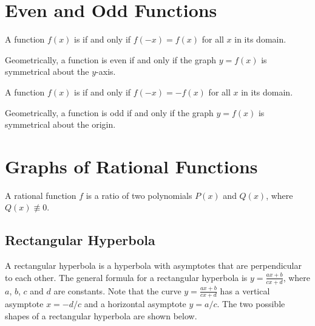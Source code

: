 \section{Even and Odd Functions}

\begin{definition}
    A function $f(x)$ is  if and only if $f(-x) = f(x)$ for all $x$ in its domain.
\end{definition}

Geometrically, a function is even if and only if the graph $y = f(x)$ is symmetrical about the $y$-axis.

\begin{definition}
    A function $f(x)$ is  if and only if $f(-x) = -f(x)$ for all $x$ in its domain.
\end{definition}

Geometrically, a function is odd if and only if the graph $y = f(x)$ is symmetrical about the origin.

\section{Graphs of Rational Functions}

A rational function $f$ is a ratio of two polynomials $P(x)$ and $Q(x)$, where $Q(x) \not\equiv 0$.

\subsection{Rectangular Hyperbola}

A rectangular hyperbola is a hyperbola with asymptotes that are perpendicular to each other. The general formula for a rectangular hyperbola is $y = \frac{ax + b}{cx + d}$, where $a$, $b$, $c$ and $d$ are constants. Note that the curve $y = \frac{ax + b}{cx + d}$ has a vertical asymptote $x = -d/c$ and a horizontal asymptote $y = a/c$. The two possible shapes of a rectangular hyperbola are shown below.

